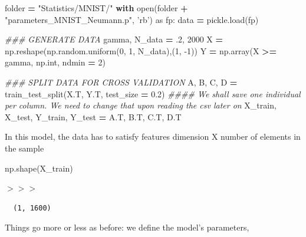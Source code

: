 \documentclass[openany,twoside]{book}
\newenvironment{Shaded}{\begin{snugshade}}{\end{snugshade}}
\newcommand{\BuiltInTok}[1]{#1}
\newcommand{\CommentTok}[1]{\textcolor[rgb]{0.56,0.35,0.01}{\textit{#1}}}
\newcommand{\ControlFlowTok}[1]{\textcolor[rgb]{0.13,0.29,0.53}{\textbf{#1}}}
\newcommand{\DecValTok}[1]{\textcolor[rgb]{0.00,0.00,0.81}{#1}}
\newcommand{\FloatTok}[1]{\textcolor[rgb]{0.00,0.00,0.81}{#1}}
\newcommand{\ImportTok}[1]{#1}
\newcommand{\NormalTok}[1]{#1}
\newcommand{\OperatorTok}[1]{\textcolor[rgb]{0.81,0.36,0.00}{\textbf{#1}}}
\newcommand{\StringTok}[1]{\textcolor[rgb]{0.31,0.60,0.02}{#1}}
\begin{document}
\begin{Shaded}
\begin{Highlighting}[]
\NormalTok{folder }\OperatorTok{=} \StringTok{"Statistics/MNIST/"}
\ControlFlowTok{with} \BuiltInTok{open}\NormalTok{(folder }\OperatorTok{+} \StringTok{"parameters_MNIST_Neumann.p"}\NormalTok{, }\StringTok{'rb'}\NormalTok{) }\ImportTok{as}\NormalTok{ fp: data }\OperatorTok{=}\NormalTok{ pickle.load(fp)}
\end{Highlighting}
\end{Shaded}

\begin{Shaded}
\begin{Highlighting}[]
\CommentTok{### GENERATE DATA}
\NormalTok{gamma, N_data }\OperatorTok{=} \FloatTok{.2}\NormalTok{, }\DecValTok{2000}
\NormalTok{X }\OperatorTok{=}\NormalTok{ np.reshape(np.random.uniform(}\DecValTok{0}\NormalTok{, }\DecValTok{1}\NormalTok{, N_data),(}\DecValTok{1}\NormalTok{, }\DecValTok{-1}\NormalTok{))}
\NormalTok{Y }\OperatorTok{=}\NormalTok{ np.array(X }\OperatorTok{>=}\NormalTok{ gamma, np.}\BuiltInTok{int}\NormalTok{, ndmin }\OperatorTok{=} \DecValTok{2}\NormalTok{)}

\CommentTok{### SPLIT DATA FOR CROSS VALIDATION}
\NormalTok{A, B, C, D }\OperatorTok{=}\NormalTok{ train_test_split(X.T, Y.T, test_size }\OperatorTok{=} \FloatTok{0.2}\NormalTok{)}
\CommentTok{#### We shall save one individual per column. We need to change that upon reading the csv later on}
\NormalTok{X_train, X_test, Y_train, Y_test }\OperatorTok{=}\NormalTok{ A.T, B.T, C.T, D.T}
\end{Highlighting}
\end{Shaded}

In this model, the data has to satisfy features dimension X number of elements in the sample

\begin{Shaded}
\begin{Highlighting}[]
\NormalTok{np.shape(X_train)}
\end{Highlighting}
\end{Shaded}

\(>>>\)

\begin{verbatim}
  (1, 1600)
\end{verbatim}

Things go more or less as before: we define the model's parameters,
\end{document}
